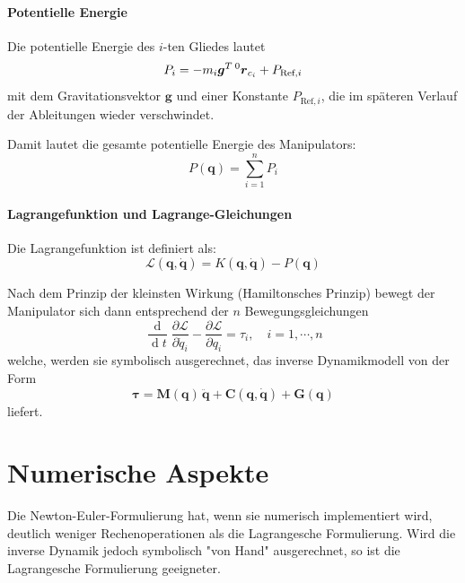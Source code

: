 \documentclass[a4paper, 11pt, accentcolor = tud3b]{tudreport}
\DeclareMathOperator{\total}{d}
\newcommand{\inreferenceto}[2]{\prescript{#1}{}{#2}}
\newcommand{\mat}[1]{\boldsymbol{#1}}
\renewcommand{\vec}[1]{\boldsymbol{#1}}
\begin{document}
			\paragraph{Potentielle Energie}
				Die potentielle Energie des \(i\)-ten Gliedes lautet
				\begin{equation*}
					P_i = -m_i \vec{g}^T \inreferenceto{0}{\vec{r}}_{c_i} + P_{\text{Ref}, i}
				\end{equation*}
				mit dem Gravitationsvektor \( \vec{g} \) und einer Konstante \( P_{\text{Ref}, i} \), die im späteren Verlauf der Ableitungen wieder verschwindet.
				
				Damit lautet die gesamte potentielle Energie des Manipulators:
				\begin{equation*}
					P(\vec{q}\!) = \sum_{i = 1}^{n} P_i
				\end{equation*}
			
			\paragraph{Lagrangefunktion und Lagrange-Gleichungen}
				Die Lagrangefunktion ist definiert als:
				\begin{equation*}
					\mathcal{L}(\vec{q}, \dot{\vec{q}}\!) = K(\vec{q}, \dot{\vec{q}}\!) - P(\vec{q}\!)
				\end{equation*}
				
				Nach dem Prinzip der kleinsten Wirkung (Hamiltonsches Prinzip) bewegt der Manipulator sich dann entsprechend der \(n\) Bewegungsgleichungen
				\begin{equation*}
					\frac{\total}{\total t} \frac{\partial \mathcal{L}}{\partial \dot{q}_i} - \frac{\partial \mathcal{L}}{\partial q_i} = \tau_i,\quad i = 1, \cdots, n
				\end{equation*}
				welche, werden sie symbolisch ausgerechnet, das inverse Dynamikmodell von der Form
				\begin{equation*}
					\vec{\tau} = \mat{M}(\vec{q}\!)\, \ddot{\vec{q}} + \vec{C}(\vec{q}, \dot{\vec{q}}\!) + \vec{G}(\vec{q}\!)
				\end{equation*}
				liefert.

		\section{Numerische Aspekte}
			Die Newton-Euler-Formulierung hat, wenn sie numerisch implementiert wird, deutlich weniger Rechenoperationen als die Lagrangesche Formulierung. Wird die inverse Dynamik jedoch symbolisch "von Hand" ausgerechnet, so ist die Lagrangesche Formulierung geeigneter.
\end{document}

